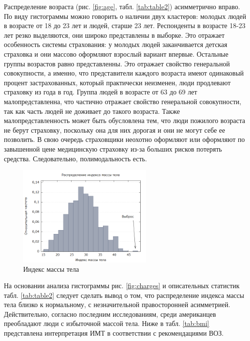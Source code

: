 \documentclass[a4paper,12pt]{article}
\begin{document}
Распределение возраста (рис. \ref{fig:age}, табл. \ref{tab:table2}) асимметрично вправо. По виду гистограммы можно говорить о наличии двух кластеров: молодых людей в возрасте от 18 до 23 лет и людей, старше 23 лет. Респонденты в возрасте 18-23 лет резко выделяются, они широко представлены в выборке. Это отражает особенность системы страхования: у молодых людей заканчивается детская страховка и они массово оформляют взрослый вариант впервые. Остальные группы возрастов равно представленны. Это отражает свойство генеральной совокупности, а именно, что представители каждого возраста имеют одинаковый процент застрахованных, который практически неизменен, люди продлевают страховку из года в год. Группа людей в возрасте от 63 до 69 лет малопредставленна, что частично отражает свойство генеральной совокупности, так как часть людей не доживает до такого возраста. Также малопредставленность может быть обусловлена тем, что люди пожилого возраста не берут страховку, поскольку она для них дорогая и они не могут себе ее позволить. В свою очередь страховщики неохотно оформляют или оформляют по завышенной цене медицинскую страховку из-за больших рисков потерять средства. Следовательно, полимодальность есть.

\begin{figure}[H]
	\includegraphics[width=0.6\textwidth]{../[graphics]/bmi.png}
	\centering
	\caption{Индекс массы тела}
	\label{fig:bmi}
\end{figure}

На основании анализа гистограммы рис. \ref{fig:charges} и описательных статистик табл. \ref{tab:table2} следует сделать вывод о том, что распределение индекса массы тела близко к нормальному, с незначительной правосторонней асимметрией. Действительно, согласно последним исследованиям, среди американцев преобладают люди с избыточной массой тела. Ниже в табл. \ref{tab:bmi} представлена интерпретация ИМТ в соответствии с рекомендациями ВОЗ.
\end{document}
